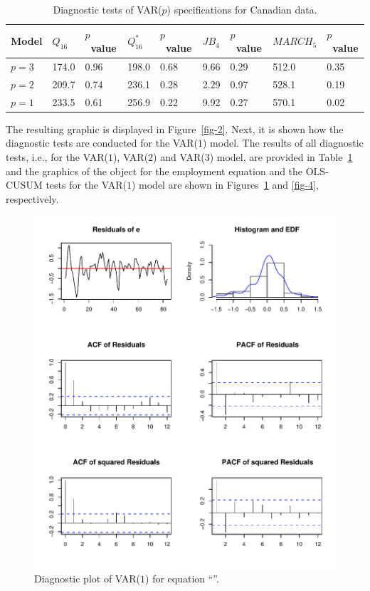 \documentclass[nojss]{jss}
\begin{document}
\begin{table}[p]
\begin{center}
\begin{tabular}{@{}lllllllll@{}}
\toprule
\multicolumn{1}{l}{Model}&
\multicolumn{1}{l}{$Q_{16}$}&
\multicolumn{1}{l}{$p$~value}&
\multicolumn{1}{l}{$Q_{16}^*$}&
\multicolumn{1}{l}{$p$~value}&
\multicolumn{1}{l}{$\textit{JB}_4$}&
\multicolumn{1}{l}{$p$~value}&
\multicolumn{1}{l}{$\textit{MARCH}_5$}&
\multicolumn{1}{l}{$p$~value}
\\
\midrule    
$p = 3$ & 174.0 &
0.96 & 
198.0 &
0.68 & 9.66 &
0.29 & 
512.0 &
0.35\\ 
$p = 2$ & 209.7 &
0.74 & 236.1 &
0.28 & 2.29 &
0.97 & 528.1 &
0.19\\ 
$p = 1$ & 233.5 &
0.61 & 256.9 &
0.22 & 9.92 &
0.27 & 570.1 &
0.02\\ 
\bottomrule
\end{tabular}
\end{center}
\caption{Diagnostic tests of VAR($p$) specifications for Canadian data.}
\label{tab-3}
\end{table}
The resulting graphic is displayed in Figure~\ref{fig-2}. Next, it is
shown how the diagnostic tests are conducted for the
VAR($1$) model. The results of all diagnostic tests, i.e., for the
VAR($1$), VAR($2$) and VAR($3$) model, are provided in
Table~\ref{tab-3} %
and the graphics of the
 object  for the employment equation and the
OLS-CUSUM tests for the VAR($1$) model are shown in
Figures~\ref{fig-3} and \ref{fig-4}, respectively. 
\begin{figure}[p!]
\centering  
\includegraphics{Figures/fig-3}
\caption{Diagnostic plot of VAR($1$) for equation ``''.}
\label{fig-3}
\end{figure}
\end{document}
